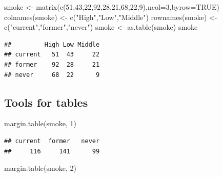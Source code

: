 \documentclass[
]{book}
\newenvironment{Shaded}{\begin{snugshade}}{\end{snugshade}}
\newcommand{\AttributeTok}[1]{\textcolor[rgb]{0.77,0.63,0.00}{#1}}
\newcommand{\ConstantTok}[1]{\textcolor[rgb]{0.00,0.00,0.00}{#1}}
\newcommand{\DecValTok}[1]{\textcolor[rgb]{0.00,0.00,0.81}{#1}}
\newcommand{\FunctionTok}[1]{\textcolor[rgb]{0.00,0.00,0.00}{#1}}
\newcommand{\NormalTok}[1]{#1}
\newcommand{\OtherTok}[1]{\textcolor[rgb]{0.56,0.35,0.01}{#1}}
\newcommand{\StringTok}[1]{\textcolor[rgb]{0.31,0.60,0.02}{#1}}
\begin{document}
\begin{Shaded}
\begin{Highlighting}[]
\NormalTok{smoke }\OtherTok{\textless{}{-}} \FunctionTok{matrix}\NormalTok{(}\FunctionTok{c}\NormalTok{(}\DecValTok{51}\NormalTok{,}\DecValTok{43}\NormalTok{,}\DecValTok{22}\NormalTok{,}\DecValTok{92}\NormalTok{,}\DecValTok{28}\NormalTok{,}\DecValTok{21}\NormalTok{,}\DecValTok{68}\NormalTok{,}\DecValTok{22}\NormalTok{,}\DecValTok{9}\NormalTok{),}\AttributeTok{ncol=}\DecValTok{3}\NormalTok{,}\AttributeTok{byrow=}\ConstantTok{TRUE}\NormalTok{)}
\FunctionTok{colnames}\NormalTok{(smoke) }\OtherTok{\textless{}{-}} \FunctionTok{c}\NormalTok{(}\StringTok{"High"}\NormalTok{,}\StringTok{"Low"}\NormalTok{,}\StringTok{"Middle"}\NormalTok{)}
\FunctionTok{rownames}\NormalTok{(smoke) }\OtherTok{\textless{}{-}} \FunctionTok{c}\NormalTok{(}\StringTok{"current"}\NormalTok{,}\StringTok{"former"}\NormalTok{,}\StringTok{"never"}\NormalTok{)}
\NormalTok{smoke }\OtherTok{\textless{}{-}} \FunctionTok{as.table}\NormalTok{(smoke)}
\NormalTok{smoke}
\end{Highlighting}
\end{Shaded}

\begin{verbatim}
##         High Low Middle
## current   51  43     22
## former    92  28     21
## never     68  22      9
\end{verbatim}

\hypertarget{tools-for-tables}{%
\subsection{Tools for tables}\label{tools-for-tables}}

\begin{Shaded}
\begin{Highlighting}[]
\FunctionTok{margin.table}\NormalTok{(smoke, }\DecValTok{1}\NormalTok{)}
\end{Highlighting}
\end{Shaded}

\begin{verbatim}
## current  former   never 
##     116     141      99
\end{verbatim}

\begin{Shaded}
\begin{Highlighting}[]
\FunctionTok{margin.table}\NormalTok{(smoke, }\DecValTok{2}\NormalTok{)}
\end{Highlighting}
\end{Shaded}
\end{document}
